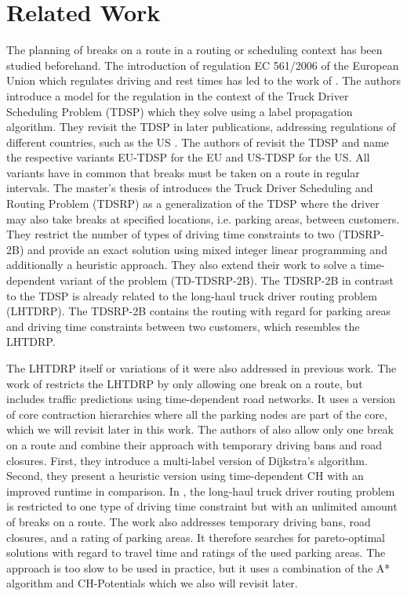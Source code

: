 
\chapter{Related Work\label{ch:related_work}}
The planning of breaks on a route in a routing or scheduling context has been studied beforehand. The introduction of regulation EC 561/2006 of the European Union \cite{europeanparliament:2006} which regulates driving and rest times has led to the work of \cite{goel:2009}. The authors introduce a model for the regulation in the context of the Truck Driver Scheduling Problem (TDSP) which they solve using a label propagation algorithm. They revisit the TDSP in later publications, addressing regulations of different countries, such as the US \cite{goel:2012}. The authors of \cite{sartori:20210107} revisit the TDSP and name the respective variants EU-TDSP for the EU and US-TDSP for the US. All variants have in common that breaks must be taken on a route in regular intervals. The master's thesis of \cite{bomsdorf:2020} introduces the Truck Driver Scheduling and Routing Problem (TDSRP) as a generalization of the TDSP where the driver may also take breaks at specified locations, i.e. parking areas, between customers. They restrict the number of types of driving time constraints to two (TDSRP-2B) and provide an exact solution using mixed integer linear programming and additionally a heuristic approach. They also extend their work to solve a time-dependent variant of the problem (TD-TDSRP-2B). The TDSRP-2B in contrast to the TDSP is already related to the long-haul truck driver routing problem (LHTDRP). The TDSRP-2B contains the routing with regard for parking areas and driving time constraints between two customers, which resembles the LHTDRP.

The LHTDRP itself or variations of it were also addressed in previous work. The work of \cite{kleff:2017} restricts the LHTDRP by only allowing one break on a route, but includes traffic predictions using time-dependent road networks. It uses a version of core contraction hierarchies where all the parking nodes are part of the core, which we will revisit later in this work. The authors of \cite{tuin:2018} also allow only one break on a route and combine their approach with temporary driving bans and road closures. First, they introduce a multi-label version of Dijkstra's algorithm. Second, they present a heuristic version using time-dependent CH with an improved runtime in comparison.  In \cite{kleff:2020}, the long-haul truck driver routing problem is restricted to one type of driving time constraint but with an unlimited amount of breaks on a route. The work also addresses temporary driving bans, road closures, and a rating of parking areas. It therefore searches for pareto-optimal solutions with regard to travel time and ratings of the used parking areas. The approach is too slow to be used in practice, but it uses a combination of the A* algorithm and CH-Potentials which we also will revisit later.

